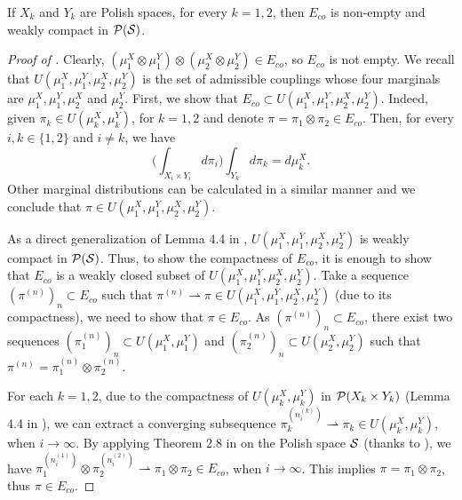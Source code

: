 \begin{lemma} \label{lemma:compact_subset}
  If $X_k$ and $Y_k$ are Polish spaces, for every $k = 1, 2$,
  then $E_{co}$ is non-empty and weakly compact in $\mathcal P(\mathcal S)$.
\end{lemma}
\begin{proof}[Proof of ]
  Clearly, $(\mu_1^X \otimes \mu_1^Y) \otimes (\mu_2^X \otimes \mu_2^Y) \in E_{co}$,
  so $E_{co}$ is not empty.
  We recall that $U(\mu_1^X, \mu_1^Y, \mu_2^X, \mu_2^Y)$ is the set of admissible couplings
  whose four marginals are $\mu^X_1, \mu^Y_1, \mu^X_2$ and $\mu^Y_2$. First,
  we show that $E_{co} \subset U(\mu_1^X, \mu_1^Y, \mu_2^X, \mu_2^Y)$.
  Indeed, given $\pi_k \in U(\mu_k^X, \mu_k^Y)$, for $k = 1,2$ and denote
  $\pi = \pi_1 \otimes \pi_2 \in E_{co}$. Then, for every $i, k \in \{ 1, 2 \}$ and $i \neq k$,
  we have
  \begin{equation}
      \bigg(\int_{X_{i} \times Y_{i}} d\pi_i \bigg) \int_{Y_k}  d\pi_k = d\mu_k^X.
  \end{equation}
  Other marginal distributions can be calculated in a similar manner and we conclude that
  $\pi \in U(\mu_1^X, \mu_1^Y, \mu_2^X, \mu_2^Y)$.

  As a direct generalization of Lemma 4.4 in \citep{Villani08},
  $U(\mu_1^X, \mu_1^Y, \mu_2^X, \mu_2^Y)$ is weakly compact in $\mathcal P(\mathcal S)$. Thus,
  to show the compactness of $E_{co}$, it is enough to show that $E_{co}$
  is a weakly closed subset of $U(\mu_1^X, \mu_1^Y, \mu_2^X, \mu_2^Y)$.
  Take a sequence $(\pi^{(n)})_n \subset E_{co}$
  such that $\pi^{(n)} \rightharpoonup \pi \in U(\mu_1^X, \mu_1^Y, \mu_2^X, \mu_2^Y)$
  (due to its compactness), we need to show that $\pi \in E_{co}$.
  As $(\pi^{(n)})_n \subset E_{co}$, there exist two sequences
  $(\pi_1^{(n)})_n \subset U(\mu_1^X, \mu_1^Y)$ and $(\pi_2^{(n)})_n \subset U(\mu_2^X, \mu_2^Y)$
  such that $\pi^{(n)} = \pi_1^{(n)} \otimes \pi_2^{(n)}$.

  For each $k = 1, 2$, due to the compactness of $U(\mu_k^X, \mu_k^Y)$ in $\mathcal P(X_k \times Y_k)$
  (Lemma 4.4 in \citep{Villani08}), we can extract a converging subsequence
  $\pi^{(n_i^{(k)})}_k \rightharpoonup \pi_k \in U(\mu_k^X, \mu_k^Y)$, when $i \to \infty$.
  By applying Theorem 2.8 in \citep{Billingsley99} on the Polish space $\mathcal S$
  (thanks to ), we have
  $\pi^{(n_i^{(1)})}_1 \otimes \pi^{(n_i^{(2)})}_2 \rightharpoonup \pi_1 \otimes \pi_2 \in E_{co}$,
  when $i \to \infty$. This implies $\pi = \pi_1 \otimes \pi_2$, thus $\pi \in E_{co}$.
\end{proof}
